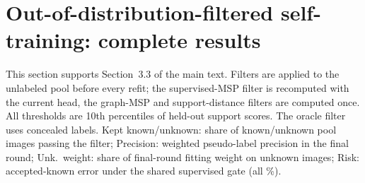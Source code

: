 \FloatBarrier
\section{Out-of-distribution-filtered self-training: complete results}\label{sec:s-ood}
This section supports Section~3.3 of the main text. Filters are applied to the unlabeled pool before every refit; the supervised-MSP filter is recomputed with the current head, the graph-MSP and support-distance filters are computed once. All thresholds are 10th percentiles of held-out support scores. The oracle filter uses concealed labels. Kept known/unknown: share of known/unknown pool images passing the filter; Precision: weighted pseudo-label precision in the final round; Unk.\ weight: share of final-round fitting weight on unknown images; Risk: accepted-known error under the shared supervised gate (all \%).

